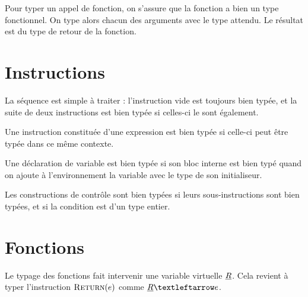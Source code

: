 Pour typer un appel de fonction, on s'assure que la fonction a bien un type
fonctionnel. On type alors chacun des arguments avec le type attendu. Le
résultat est du type de retour de la fonction.

\begin{mathpar}
\end{mathpar}

\section{Instructions}

La séquence est simple à traiter : l'instruction vide est toujours bien typée,
et la suite de deux instructions est bien typée si celles-ci le sont également.

\begin{mathpar}

\end{mathpar}

Une instruction constituée d'une expression est bien typée si celle-ci peut être
typée dans ce même contexte.

\begin{mathpar}
\end{mathpar}

Une déclaration de variable est bien typée si son bloc interne est bien typé
quand on ajoute à l'environnement la variable avec le type de son initialiseur.

\begin{mathpar}
\end{mathpar}

Les constructions de contrôle sont bien typées si leurs sous-instructions sont
bien typées, et si la condition est d'un type entier.

\begin{mathpar}

\end{mathpar}

\section{Fonctions}

Le typage des fonctions fait intervenir une variable virtuelle $\vRet$. Cela
revient à typer l'instruction $\iReturn{e}$ comme $\vRet ← e$.

\begin{mathpar}
\end{mathpar}

